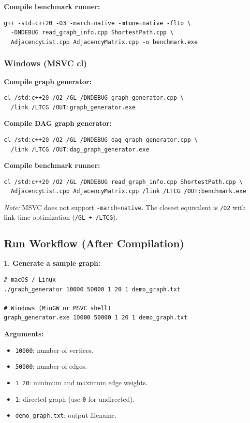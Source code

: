 \textbf{Compile benchmark runner:}
\begin{verbatim}
g++ -std=c++20 -O3 -march=native -mtune=native -flto \
  -DNDEBUG read_graph_info.cpp ShortestPath.cpp \
  AdjacencyList.cpp AdjacencyMatrix.cpp -o benchmark.exe
\end{verbatim}

\subsubsection{Windows (MSVC cl)}
\textbf{Compile graph generator:}
\begin{verbatim}
cl /std:c++20 /O2 /GL /DNDEBUG graph_generator.cpp \
  /link /LTCG /OUT:graph_generator.exe
\end{verbatim}

\textbf{Compile DAG graph generator:}
\begin{verbatim}
cl /std:c++20 /O2 /GL /DNDEBUG dag_graph_generator.cpp \
  /link /LTCG /OUT:dag_graph_generator.exe
\end{verbatim}

\textbf{Compile benchmark runner:}
\begin{verbatim}
cl /std:c++20 /O2 /GL /DNDEBUG read_graph_info.cpp ShortestPath.cpp \
  AdjacencyList.cpp AdjacencyMatrix.cpp /link /LTCG /OUT:benchmark.exe
\end{verbatim}

\textit{Note:} MSVC does not support \texttt{-march=native}. The closest equivalent is \texttt{/O2} with link-time optimization (\texttt{/GL + /LTCG}).

\subsection{Run Workflow (After Compilation)}
\textbf{1. Generate a sample graph:}
\begin{verbatim}
# macOS / Linux
./graph_generator 10000 50000 1 20 1 demo_graph.txt

# Windows (MinGW or MSVC shell)
graph_generator.exe 10000 50000 1 20 1 demo_graph.txt
\end{verbatim}

\textbf{Arguments:}
\begin{itemize}
  \item \texttt{10000}: number of vertices.
  \item \texttt{50000}: number of edges.
  \item \texttt{1 20}: minimum and maximum edge weights.
  \item \texttt{1}: directed graph (use \texttt{0} for undirected).
  \item \texttt{demo\_graph.txt}: output filename.
\end{itemize}

